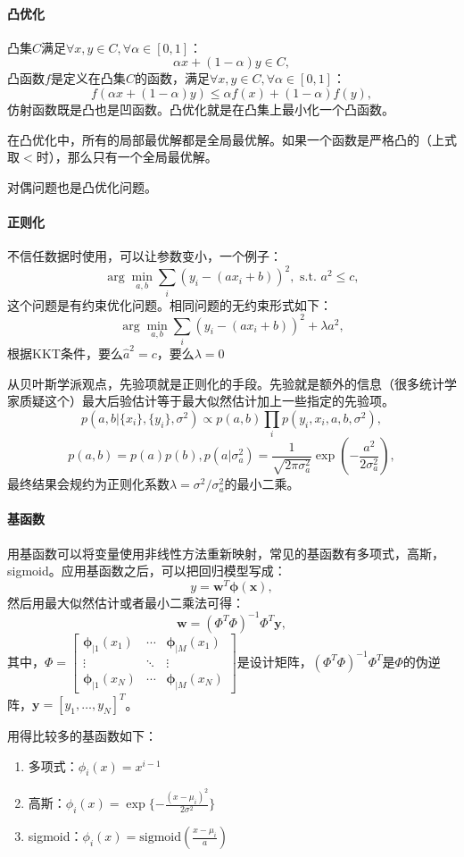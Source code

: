 \paragraph{凸优化} 凸集$C$满足$\forall x,y \in C, \forall \alpha \in [0,1]$：
$$\alpha x + (1-\alpha)y \in C,$$
凸函数$f$是定义在凸集$C$的函数，满足$\forall x,y \in C, \forall \alpha \in [0,1]$：
$$f(\alpha x + (1-\alpha)y) \le \alpha f(x) + (1-\alpha)f(y),$$
仿射函数既是凸也是凹函数。凸优化就是在凸集上最小化一个凸函数。

在凸优化中，所有的局部最优解都是全局最优解。如果一个函数是严格凸的（上式取$<$时），那么只有一个全局最优解。

对偶问题也是凸优化问题。

\paragraph{正则化} 不信任数据时使用，可以让参数变小，一个例子：$$\arg\min_{a,b}\sum_i(y_i-(ax_i + b))^2,\text{ s.t. }a^2 \le c,$$
这个问题是有约束优化问题。相同问题的无约束形式如下：
$$\arg\min_{a,b}\sum_i(y_i-(ax_i + b))^2+\lambda a^2,$$
根据KKT条件，要么$\hat{a}^2 = c$，要么$\lambda = 0$

从贝叶斯学派观点，先验项就是正则化的手段。先验就是额外的信息（很多统计学家质疑这个）最大后验估计等于最大似然估计加上一些指定的先验项。
$$p(a,b|\{x_i\}, \{y_i\}, \sigma^2) \propto p(a,b) \prod_i p(y_i, x_i, a, b, \sigma^2),$$
$$p(a,b) = p(a)p(b), p(a|\sigma_a^2) = \frac{1}{\sqrt{2\pi\sigma_a^2}}\exp(-\frac{a^2}{2\sigma_a^2}),$$
最终结果会规约为正则化系数$\lambda = \sigma^2/\sigma_a^2$的最小二乘。

\paragraph{基函数}
用基函数可以将变量使用非线性方法重新映射，常见的基函数有多项式，高斯，sigmoid。应用基函数之后，可以把回归模型写成：
$$y = \bm{w}^T\bm\phi(\bm{x}),$$
然后用最大似然估计或者最小二乘法可得：
$$\bm w = (\Phi^T\Phi)^{-1}\Phi^T\bm y,$$其中，$\Phi = \begin{bmatrix}
\bm\phi_{|1}(x_1) & \cdots & \bm\phi_{|M}(x_1) \\
\vdots & \ddots & \vdots \\
\bm\phi_{|1}(x_N) & \cdots & \bm\phi_{|M}(x_N)
\end{bmatrix}$是设计矩阵，$(\Phi^T\Phi)^{-1}\Phi^T$是$\Phi$的伪逆阵，$\bm y = [y_1, \ldots, y_N]^T$。

用得比较多的基函数如下：
\begin{enumerate}
    \item 多项式：$\phi_i(x) = x^{i-1}$
    \item 高斯：$\phi_i(x) = \exp\{-\frac{(x-\mu_i)^2}{2\sigma^2}\}$
    \item sigmoid：$\phi_i(x) = \mathrm{sigmoid}(\frac{x - \mu_i}{a})$
\end{enumerate}

